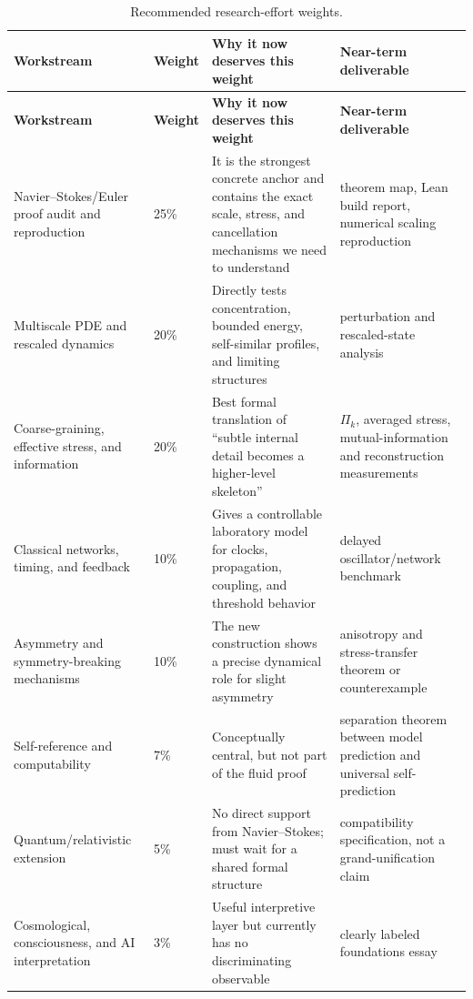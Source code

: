 \documentclass[11pt]{article}
\newcommand{\Coarse}{\Pi}
\theoremstyle{definition}
\theoremstyle{plain}
\theoremstyle{remark}
\begin{document}
\begin{longtable}{P{0.23\textwidth}P{0.095\textwidth}P{0.295\textwidth}P{0.27\textwidth}}
\caption{Recommended research-effort weights.}\label{tab:weights}\\
\toprule
\textbf{Workstream} & \textbf{Weight} & \textbf{Why it now deserves this weight} & \textbf{Near-term deliverable}\\
\midrule
\endfirsthead
\toprule
\textbf{Workstream} & \textbf{Weight} & \textbf{Why it now deserves this weight} & \textbf{Near-term deliverable}\\
\midrule
\endhead
Navier--Stokes/Euler proof audit and reproduction & 25\% & It is the strongest concrete anchor and contains the exact scale, stress, and cancellation mechanisms we need to understand & theorem map, Lean build report, numerical scaling reproduction\\
Multiscale PDE and rescaled dynamics & 20\% & Directly tests concentration, bounded energy, self-similar profiles, and limiting structures & perturbation and rescaled-state analysis\\
Coarse-graining, effective stress, and information & 20\% & Best formal translation of ``subtle internal detail becomes a higher-level skeleton'' & $\Coarse_k$, averaged stress, mutual-information and reconstruction measurements\\
Classical networks, timing, and feedback & 10\% & Gives a controllable laboratory model for clocks, propagation, coupling, and threshold behavior & delayed oscillator/network benchmark\\
Asymmetry and symmetry-breaking mechanisms & 10\% & The new construction shows a precise dynamical role for slight asymmetry & anisotropy and stress-transfer theorem or counterexample\\
Self-reference and computability & 7\% & Conceptually central, but not part of the fluid proof & separation theorem between model prediction and universal self-prediction\\
Quantum/relativistic extension & 5\% & No direct support from Navier--Stokes; must wait for a shared formal structure & compatibility specification, not a grand-unification claim\\
Cosmological, consciousness, and AI interpretation & 3\% & Useful interpretive layer but currently has no discriminating observable & clearly labeled foundations essay\\
\bottomrule
\end{longtable}
\end{document}
